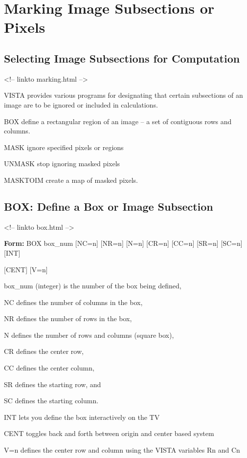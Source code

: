 \chapter{Marking Image Subsections or Pixels}

\section{Selecting Image Subsections for Computation}
\begin{rawhtml}
<!-- linkto marking.html -->
\end{rawhtml}

%
%

VISTA provides various programs for designating that certain subsections of
an image are to be ignored or included in calculations.
\begin{example}
  \item[BOX\hfill]{define a rectangular region of an image --
       a set of contiguous rows and columns.}
  \item[MASK\hfill]{ignore specified pixels or regions}
  \item[UNMASK\hfill]{stop ignoring masked pixels}
  \item[MASKTOIM\hfill]{create a map of masked pixels.}
\end{example}

\section{BOX: Define a Box or Image Subsection}
\begin{rawhtml}
<!-- linkto box.html -->
\end{rawhtml}
\begin{command}
  \item[\textbf{Form:}  BOX box\_num {[NC=n]} {[NR=n]} {[N=n]} {[CR=n]} 
       {[CC=n]} {[SR=n]} {[SC=n]} {[INT]}\hfill]{}
  \item{   {[CENT]} {[V=n]}}
  \item[box\_num]{(integer) is the number of the box being defined,}
  \item[NC]{defines the number of columns in the box,}
  \item[NR]{defines the number of rows in the box,}
  \item[N  ]{ defines the number of rows and columns (square box),}
  \item[CR]{defines the center row,}
  \item[CC]{defines the center column,}
  \item[SR]{defines the starting row, and}
  \item[SC]{defines the starting column.}
  \item[INT]{lets you define the box interactively on the TV}
  \item[CENT]{toggles back and forth between origin and center based system}
  \item[V=n  ]{defines the center row and column using the
       VISTA variables Rn and Cn}
\end{command}

